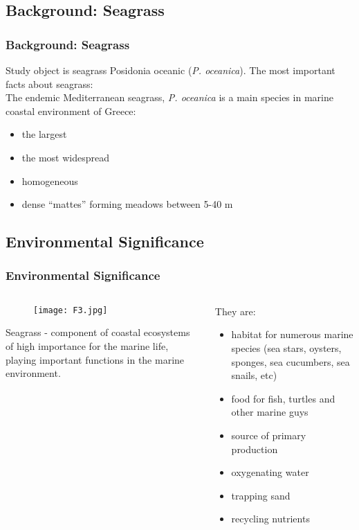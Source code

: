 \documentclass[pdflatex,compress,8pt,
	xcolor={dvipsnames,dvipsnames,svgnames,x11names,table},
	hyperref={colorlinks = true,breaklinks = true, urlcolor = NavyBlue, breaklinks = true}]{beamer}
\begin{document}
\subsection{Background: Seagrass}
\begin{frame}\frametitle{Background: Seagrass}
Study object is seagrass Posidonia oceanic (\emph{P. oceanica}).
The most important facts about seagrass:\\
The endemic Mediterranean seagrass, \emph{P. oceanica} is a main species in marine coastal environment of Greece:
\begin{itemize}
	\item the largest
	\item the most widespread
	\item homogeneous
	\item dense “mattes” forming meadows between 5-40 m
\end{itemize}
\begin{figure}[H]
	\centering
			\hspace{1mm}
			\hspace{1mm}
\end{figure}
\end{frame}

\subsection{Environmental Significance}
\begin{frame}\frametitle{Environmental Significance}
\begin{minipage}[0.4\textheight]{\textwidth}
\begin{columns}[T]
\begin{column}{0.5\textwidth}
\vspace{1em}
\begin{figure}[H]
	\centering
		\texttt{[image: F3.jpg]}
\end{figure}
Seagrass - component of coastal ecosystems of high importance for the marine life, playing important functions in the marine environment.
\end{column}
\begin{column}{0.5\textwidth}
\vspace{2em} 
They are:
\begin{itemize}
	\item habitat for numerous marine species
(sea stars, oysters, sponges, sea cucumbers, sea snails, etc)
	\item food for fish, turtles and other marine guys
	\item source of primary production
	\item oxygenating water
	\item trapping sand
	\item recycling nutrients
\end{itemize}
\end{column}
\end{columns}
\end{minipage}
\end{frame}
\end{document}
